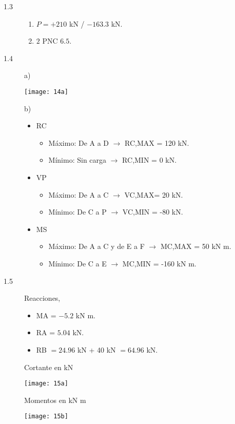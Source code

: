 \begin{description}
%
\item[1.3]

\begin{enumerate}[label=\alph*)]
	
\item $P = +210$ kN / $- 163.3$ kN.

\item $2$ PNC $6.5$.

\end{enumerate}
\item [1.4]


a)

	\begin{center}
		\texttt{[image: 14a]}
	\end{center}
b)
\begin{itemize}
\item RC
\begin{itemize}
	\item Máximo: De A a D $\rightarrow$ RC,MAX = 120 kN.
    \item Mínimo: Sin carga $\rightarrow$ RC,MIN = 0 kN.
    \end{itemize}
\item VP
\begin{itemize}
	\item Máximo: De A a C $\rightarrow$ VC,MAX= 20 kN.
    \item Mínimo: De C a P $\rightarrow$ VC,MIN = -80 kN.
    \end{itemize}
\item MS
\begin{itemize}
	\item Máximo: De A a C y de E a F $\rightarrow$ MC,MAX = 50 kN m.
   \item Mínimo: De C a E $\rightarrow$ MC,MIN = -160 kN m.
\end{itemize}
\end{itemize}

\item [1.5]
%
Reacciones,
\begin{itemize}
\item MA = $-5.2$ kN m.
\item  RA = $5.04$ kN.
\item RB $= 24.96$ kN + 40 kN  $= 64.96$ kN.
\end{itemize}
%


Cortante en kN

\begin{center}
	\texttt{[image: 15a]}
\end{center}

Momentos en kN m
 
 \begin{center}
 	\texttt{[image: 15b]}
 \end{center}

\end{description}



